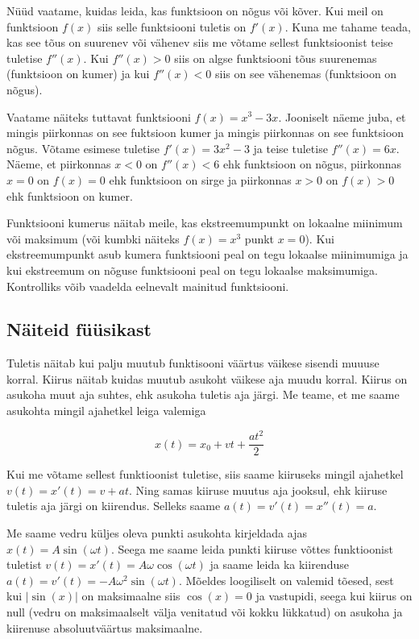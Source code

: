 \documentclass[a4paper,11pt,twocolumn]{article}
\begin{document}
Nüüd vaatame, kuidas leida, kas funktsioon on nõgus või kõver. Kui meil on funktsioon $f(x)$ siis selle funktsiooni tuletis on $f'(x)$. Kuna me tahame teada, kas see tõus on suurenev või vähenev siis me võtame sellest funktsioonist teise tuletise $f''(x)$. Kui $f''(x) > 0$ siis on algse funktsiooni tõus suurenemas (funktsioon on kumer) ja kui $f''(x) < 0$ siis on see vähenemas (funktsioon on nõgus).

Vaatame näiteks tuttavat funktsiooni $f(x) = x^3 - 3x$. Jooniselt näeme juba, et mingis piirkonnas on see fuktsioon kumer ja mingis piirkonnas on see funktsioon nõgus. Võtame esimese tuletise $f'(x) = 3x^2 - 3$ ja teise tuletise $f''(x) = 6x$. Näeme, et piirkonnas $x < 0$ on $f''(x) < 6$ ehk funktsioon on nõgus, piirkonnas $x=0$ on $f(x) = 0$ ehk funktsioon on sirge ja piirkonnas $x>0$ on $f(x) > 0$ ehk funktsioon on kumer.

Funktsiooni kumerus näitab meile, kas ekstreemumpunkt on lokaalne miinimum või maksimum (või kumbki näiteks $f(x) = x^3$ punkt $x=0$). Kui ekstreemumpunkt asub kumera funktsiooni peal on tegu lokaalse miinimumiga ja kui ekstreemum on nõguse funktsiooni peal on tegu lokaalse maksimumiga. Kontrolliks võib vaadelda eelnevalt mainitud funktsiooni.

\subsection{Näiteid füüsikast}
Tuletis näitab kui palju muutub funktisooni väärtus väikese sisendi muuuse korral. Kiirus näitab kuidas muutub asukoht väikese aja muudu korral. Kiirus on asukoha muut aja suhtes, ehk asukoha tuletis aja järgi. Me teame, et me saame asukohta mingil ajahetkel leiga valemiga

\begin{equation}
x(t) = x_0 + vt + \frac{at^2}{2}
\end{equation}

Kui me võtame sellest funktioonist tuletise, siis saame kiiruseks mingil ajahetkel $v(t) = x'(t) = v + at$. Ning samas kiiruse muutus aja jooksul, ehk  kiiruse tuletis aja järgi on kiirendus. Selleks saame $a(t) = v'(t) = x''(t) = a$.

Me saame vedru küljes oleva punkti asukohta kirjeldada ajas $x(t)=A\sin(\omega t)$. Seega me saame leida punkti kiiruse võttes funktioonist tuletist $v(t)=x'(t)=A\omega\cos(\omega t)$ ja saame leida ka kiirenduse $a(t)=v'(t)=-A\omega^2\sin(\omega t)$. Mõeldes loogiliselt on valemid tõesed, sest kui $|\sin(x)|$ on maksimaalne siis $\cos(x) = 0$ ja vastupidi, seega kui kiirus on null (vedru on maksimaalselt välja venitatud või kokku lükkatud) on asukoha ja kiirenuse absoluutväärtus maksimaalne.
\end{document}
